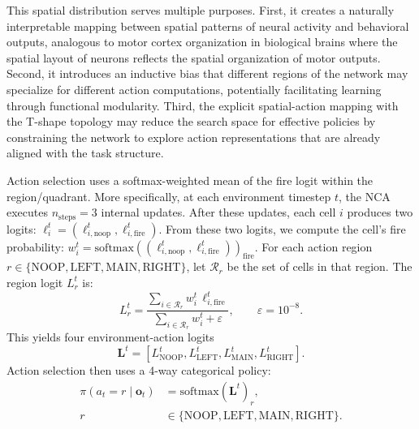 \documentclass[letterpaper]{article}
\newcommand{\bh}[1]{{\color{black}#1}}  %
\begin{document}

This spatial distribution serves multiple purposes. First, it creates a naturally interpretable mapping between spatial patterns of neural activity and behavioral outputs, analogous to motor cortex organization in biological brains where the spatial layout of neurons reflects the spatial organization of motor outputs. Second, it introduces an inductive bias that different regions of the network may specialize for different action computations, potentially facilitating learning through functional modularity. Third, the explicit spatial-action mapping with the T-shape topology may reduce the search space for effective policies by constraining the network to explore action representations that are already aligned with the task structure. 

Action selection uses a softmax-weighted mean of the fire logit within the region/quadrant. More specifically, at each environment timestep $t$, the NCA executes $n_{\text{steps}}=3$ internal updates. After these updates, each cell $i$ produces two logits:
$\boldsymbol{\ell}_i^t=(\ell_{i,\text{noop}}^t,\ell_{i,\text{fire}}^t)$.
From these two logits, we compute the cell's fire probability:
$w_i^t=\mathrm{softmax}\left((\ell_{i,\text{noop}}^t,\ell_{i,\text{fire}}^t)\right)_{\text{fire}}$.
For each action region $r\in\{\text{NOOP},\text{LEFT},\text{MAIN},\text{RIGHT}\}$,
let $\mathcal{R}_r$ be the set of cells in that region. The region logit \bh{$L_r^t$} is:
\begin{equation}
L_r^t=\frac{\sum_{i\in\mathcal{R}_r} w_i^t\,\ell_{i,\text{fire}}^t}
{\sum_{i\in\mathcal{R}_r} w_i^t+\varepsilon},\qquad \varepsilon=10^{-8}.
\end{equation}
%
This yields four environment-action logits
\begin{equation}
\mathbf{L}^t=[L_{\text{NOOP}}^t,L_{\text{LEFT}}^t,L_{\text{MAIN}}^t,L_{\text{RIGHT}}^t].
\end{equation}
%
Action selection then uses a 4-way categorical policy:
\begin{equation}
\begin{aligned}
\pi(a_t=r\mid \mathbf{o}_t) &= \mathrm{softmax}(\mathbf{L}^t)_r,\\
r &\in \{\text{NOOP},\text{LEFT},\text{MAIN},\text{RIGHT}\}.
\end{aligned}
\end{equation}
\end{document}
